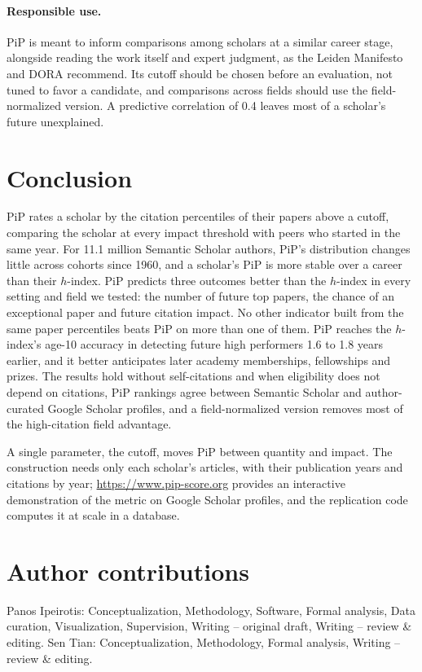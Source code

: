 \documentclass[11pt]{article}
\begin{document}
\paragraph{Responsible use.} PiP is meant to inform comparisons among scholars at a similar career stage, alongside
reading the work itself and expert judgment, as the Leiden Manifesto \citep{hicks2015bibliometrics} and DORA
\citep{dora2012} recommend. Its cutoff should be chosen before an evaluation, not tuned to favor a candidate, and
comparisons across fields should use the field-normalized version. A predictive correlation of 0.4 leaves most of a
scholar's future unexplained.

\section{Conclusion}
\label{sec:conclusion}

PiP rates a scholar by the citation percentiles of their papers above a cutoff, comparing the scholar at every impact
threshold with peers who started in the same year. For 11.1 million Semantic Scholar authors, PiP's distribution changes
little across cohorts since 1960, and a scholar's PiP is more stable over a career than their $h$-index. PiP predicts
three outcomes better than the $h$-index in every setting and field we tested: the number of future top papers, the
chance of an exceptional paper and future citation impact. No other indicator built from the same paper percentiles
beats PiP on more than one of them. PiP reaches the $h$-index's age-10 accuracy in detecting future high performers 1.6
to 1.8 years earlier, and it better anticipates later academy memberships, fellowships and prizes. The results hold
without self-citations and when eligibility does not depend on citations, PiP rankings agree between Semantic Scholar
and author-curated Google Scholar profiles, and a field-normalized version removes most of the high-citation field
advantage.

A single parameter, the cutoff, moves PiP between quantity and impact. The construction needs only each scholar's
articles, with their publication years and citations by year; \url{https://www.pip-score.org} provides an interactive
demonstration of the metric on Google Scholar profiles, and the replication code computes it at scale in a database.
\section*{Author contributions}
Panos Ipeirotis: Conceptualization, Methodology, Software, Formal analysis, Data curation, Visualization, Supervision,
Writing -- original draft, Writing -- review \& editing. Sen Tian: Conceptualization, Methodology, Formal analysis,
Writing -- review \& editing.
\end{document}
